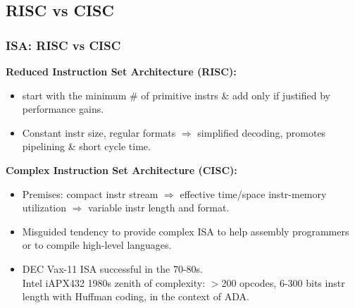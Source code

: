 \documentclass{beamer}
\begin{document}
\subsection{RISC vs CISC}
\begin{frame}[fragile,t]
\frametitle{ISA: RISC vs CISC}

{\bf Reduced Instruction Set Architecture (RISC):}
\begin{itemize} 
    \item start with the minimum \# of primitive instrs \& add only 
            if justified by performance gains.\smallskip
    \item Constant instr size, regular formats $\Rightarrow$ simplified decoding, 
            promotes pipelining \& short cycle time.
\end  {itemize}

\bigskip

{\bf Complex Instruction Set Architecture (CISC):}
\begin{itemize} 
    \item Premises: compact instr stream $\Rightarrow$ effective time/space 
            instr-memory utilization $\Rightarrow$ variable instr length and format.\smallskip
    \item Misguided tendency to provide complex ISA to help assembly programmers or to 
            compile high-level languages.\smallskip
    \item DEC Vax-11 ISA successful in the 70-80s.\\
          Intel iAPX432 1980s zenith of complexity: $>$200 opcodes, 6-300 bits instr length   
            with Huffman coding, in the context of ADA.
\end  {itemize}
\end{frame}
\end{document}

